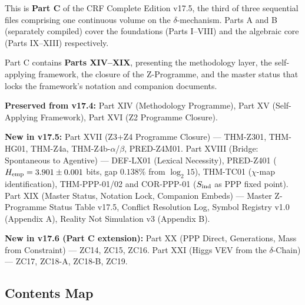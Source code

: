 \documentclass[11pt, a4paper]{article}
\begin{document}
\begin{volumebox}[title={Part C --- CRF Complete Edition v17.6 (Parts XIV--XXI)}]
\sloppy
This is \textbf{Part C} of the CRF Complete Edition v17.5, the third
of three sequential files comprising one continuous volume on the
$\delta$-mechanism. Parts A and B (separately compiled) cover the
foundations (Parts I--VIII) and the algebraic core (Parts IX--XIII)
respectively.

Part C contains \textbf{Parts XIV--XIX}, presenting the methodology layer,
the self-applying framework, the closure of the Z-Programme, and the
master status that locks the framework's notation and companion documents.

\textbf{Preserved from v17.4:} Part XIV (Methodology Programme),
Part XV (Self-Applying Framework), Part XVI (Z2 Programme Closure).

\textbf{New in v17.5:} Part XVII (Z3+Z4 Programme Closure) ---
THM-Z301, THM-HG01, THM-Z4a, THM-Z4b-$\alpha$/$\beta$, PRED-Z4M01.
Part XVIII (Bridge: Spontaneous to Agentive) --- DEF-LX01 (Lexical
Necessity), PRED-Z401 ($H_{\rm emp} = 3.901 \pm 0.001$ bits, gap
$0.138\%$ from $\log_2 15$), THM-TC01 ($\chi$-map identification),
THM-PPP-01/02 and COR-PPP-01 ($S_{\rm ind}$ as PPP fixed point).
Part XIX (Master Status, Notation Lock, Companion Embeds) ---
Master Z-Programme Status Table v17.5, Conflict Resolution Log,
Symbol Registry v1.0 (Appendix A), Reality Not Simulation v3 (Appendix B).

\textbf{New in v17.6 (Part C extension):}
Part XX (PPP Direct, Generations, Mass from Constraint) --- ZC14, ZC15, ZC16.
Part XXI (Higgs VEV from the $\delta$-Chain) --- ZC17, ZC18-A, ZC18-B, ZC19.
\end{volumebox}

\subsection*{Contents Map}
\end{document}
